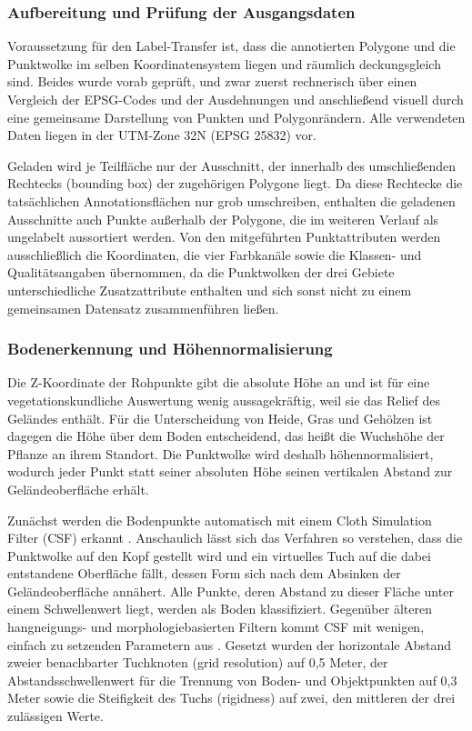 \subsubsection{Aufbereitung und Prüfung der Ausgangsdaten}\label{georeferenz}

Voraussetzung für den Label-Transfer ist, dass die annotierten Polygone und die Punktwolke im selben Koordinatensystem liegen und räumlich deckungsgleich sind. Beides wurde vorab geprüft, und zwar zuerst rechnerisch über einen Vergleich der EPSG-Codes und der Ausdehnungen und anschließend visuell durch eine gemeinsame Darstellung von Punkten und Polygonrändern. Alle verwendeten Daten liegen in der UTM-Zone 32N (EPSG 25832) vor.

Geladen wird je Teilfläche nur der Ausschnitt, der innerhalb des umschließenden Rechtecks (bounding box) der zugehörigen Polygone liegt. Da diese Rechtecke die tatsächlichen Annotationsflächen nur grob umschreiben, enthalten die geladenen Ausschnitte auch Punkte außerhalb der Polygone, die im weiteren Verlauf als ungelabelt aussortiert werden. Von den mitgeführten Punktattributen werden ausschließlich die Koordinaten, die vier Farbkanäle sowie die Klassen- und Qualitätsangaben übernommen, da die Punktwolken der drei Gebiete unterschiedliche Zusatzattribute enthalten und sich sonst nicht zu einem gemeinsamen Datensatz zusammenführen ließen.

\subsubsection{Bodenerkennung und Höhennormalisierung}\label{hoehennormalisierung}

Die Z-Koordinate der Rohpunkte gibt die absolute Höhe an und ist für eine vegetationskundliche Auswertung wenig aussagekräftig, weil sie das Relief des Geländes enthält. Für die Unterscheidung von Heide, Gras und Gehölzen ist dagegen die Höhe über dem Boden entscheidend, das heißt die Wuchshöhe der Pflanze an ihrem Standort. Die Punktwolke wird deshalb höhennormalisiert, wodurch jeder Punkt statt seiner absoluten Höhe seinen vertikalen Abstand zur Geländeoberfläche erhält.

Zunächst werden die Bodenpunkte automatisch mit einem Cloth Simulation Filter (CSF) erkannt \cite{Zhang.2016}. Anschaulich lässt sich das Verfahren so verstehen, dass die Punktwolke auf den Kopf gestellt wird und ein virtuelles Tuch auf die dabei entstandene Oberfläche fällt, dessen Form sich nach dem Absinken der Geländeoberfläche annähert. Alle Punkte, deren Abstand zu dieser Fläche unter einem Schwellenwert liegt, werden als Boden klassifiziert. Gegenüber älteren hangneigungs- und morphologiebasierten Filtern kommt CSF mit wenigen, einfach zu setzenden Parametern aus \cite{Zhang.2016}. Gesetzt wurden der horizontale Abstand zweier benachbarter Tuchknoten (grid resolution) auf 0,5 Meter, der Abstandsschwellenwert für die Trennung von Boden- und Objektpunkten auf 0,3 Meter sowie die Steifigkeit des Tuchs (rigidness) auf zwei, den mittleren der drei zulässigen Werte.

